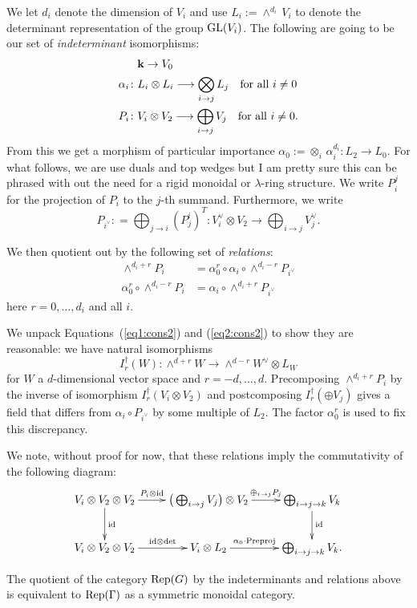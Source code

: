 \documentclass[11pt]{amsart}
\begin{document}
We let $d_i$ denote the dimension of $V_i$ and use $L_i:= \wedge^{d_i} \,V_i$ to denote the determinant representation of the group $\operatorname{GL}(V_i)$.
The following are going to be our set of {\em indeterminant} isomorphisms:
\begin{align}
    &\mathbf{k} \rightarrow V_0 \\
\alpha_i \colon &L_i \otimes L_i \longrightarrow \bigotimes_{i \rightarrow j} L_j \quad \text{for all} \,\, i\neq 0 \label{fd:alpha} \\
 P_i \colon &V_i \otimes V_2 \longrightarrow \bigoplus_{i \rightarrow j} V_j \quad \text{for all} \,\, i\neq 0. \label{fd:P}
\end{align}
From this we get a morphism of particular importance $\alpha_0:= \otimes_i \,\alpha_i^{d_i}: L_2 \rightarrow L_0$.
{\red For what follows, we are use duals and top wedges but I am pretty sure this can be phrased with out the need for a rigid monoidal or $\lambda$-ring structure.}
We write $P_i^j$ for the projection of $P_i$ to the $j$-th summand. 
Furthermore, we write $$ P_{i^\vee}: = \bigoplus_{j \rightarrow i} (P_j^i)^T \colon V_i^\vee \otimes V_2 \longrightarrow \bigoplus_{i \rightarrow j} V_j^\vee.$$

We then quotient out by the following set of {\em relations}:
\begin{align}
    \wedge^{d_i+r} P_i &= \alpha_0^r \circ \alpha_i \circ \wedge^{d_i-r} P_{i^\vee}  \label{eq1:cons2} \\
    \alpha_0^r \circ \wedge^{d_i-r} P_i &= \alpha_i \circ \wedge^{d_i+r} P_{i^\vee}  \label{eq2:cons2} 
\end{align}
here $r =0,\ldots, d_i$ and all $i$.

We unpack Equations~(\ref{eq1:cons2}) and (\ref{eq2:cons2}) to show they are reasonable: we have natural isomorphisms
$$I^\dagger_r(W) \colon \wedge^{d+r} W \rightarrow \wedge^{d-r} W^\vee \otimes L_W$$ for $W$ a $d$-dimensional vector space and $r= -d, \ldots, d$.
Precomposing $\wedge^{d_i+r} P_i$ by the inverse of isomorphism $I^{\dagger}_r(V_i \otimes V_2)$ and postcomposing $I^{\dagger}_r(\oplus V_j)$ gives a field that differs from $\alpha_i \circ P_{i^\vee}$ by some multiple of $L_2$.
The factor $\alpha_0^r$ is used to fix this discrepancy.

We note, {\red without proof for now}, that these relations imply the commutativity of the following diagram:
\begin{equation*}
    \xymatrix{V_i \otimes V_2 \otimes V_2 \ar[r]^-{P_i \otimes \text{id}} \ar[d]^{\text{id}} & \big(\bigoplus_{i \rightarrow j}  V_j\big) \otimes V_2 \ar[r]^-{\oplus_{i \rightarrow j} P_j} & \bigoplus_{i \rightarrow j \rightarrow k} V_k \ar[d]^{\text{id}} \\
    V_i \otimes V_2 \otimes V_2 \ar[r]^-{\text{id} \otimes \text{det}} & V_i \otimes L_2 \ar[r]^-{\alpha_0 \cdot \text{Preproj}} & \bigoplus_{i \rightarrow j \rightarrow k} V_k.}
\end{equation*}

\begin{proposition}
The quotient of the category $\operatorname{Rep}(G)$ by the indeterminants and relations above is equivalent to $\operatorname{Rep}(\Gamma)$ as a symmetric monoidal category.
\end{proposition}
\end{document}
